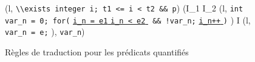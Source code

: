 \begin{figure*}[bt]
  \scriptsize{
    {
      {
        \splitfrac
            {(l, \mbox{\lstinline'\\exists integer i; t1 <= i < t2 && p'})
            }
            {
              (I_1 \concat I_2\concat
              (l,
              \mbox{\lstinline'int var_n = 0; for('}
              \underline{\Zinit \mbox{\lstinline'i_n = e1'} \Zclear}
              \semicolon
              \underline{\mbox{\lstinline'i_n < e2'} \Zclear}
              \mbox{\lstinline' && !var_n;'}
              \underline{\mbox{\lstinline'i_n++'} \Zclear}
              \mbox{\lstinline')'} \bopen)
              \concat I \concat (l,
              \mbox{\lstinline'var_n = e;'} \bclose),
              \mbox{\lstinline'var_n'})
            }
      }
    }
  }
  \caption{Règles de traduction pour les prédicats quantifiés}
  \label{fig:quantif}
\end{figure*}
